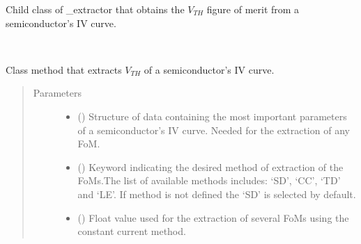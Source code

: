 \documentclass[letterpaper,10pt,english,openany, oneside]{sphinxmanual}
\begin{document}
\begin{fulllineitems}
\label{\detokenize{index:fompy.fom.vth_ext}}
Child class of \_extractor that obtains the \(V_{TH}\) figure of merit from a semiconductor’s IV curve.

\begin{fulllineitems}
\label{\detokenize{index:fompy.fom.vth_ext.extraction}}~

\begin{fulllineitems}
Class method that extracts \(V_{TH}\) of a semiconductor’s IV curve.

\end{fulllineitems}

\begin{quote}\begin{description}
\item[{Parameters}] \leavevmode\begin{itemize}
\item {} 
 () \textendash{} Structure of data containing the most important parameters of a semiconductor’s IV curve.
Needed for the extraction of any FoM.

\item {} 
 () \textendash{} Keyword indicating the desired method of extraction of the FoMs.The list of available methods includes:
‘SD’, ‘CC’, ‘TD’ and ‘LE’. If method is not defined the ‘SD’ is selected by default.

\item {} 
 (\sphinxstyleliteralemphasis{\sphinxupquote{, }}) \textendash{} Float value used for the extraction of several FoMs using the constant current method.

\end{itemize}


\end{description}
\end{quote}
\end{fulllineitems}
\end{fulllineitems}
\end{document}
